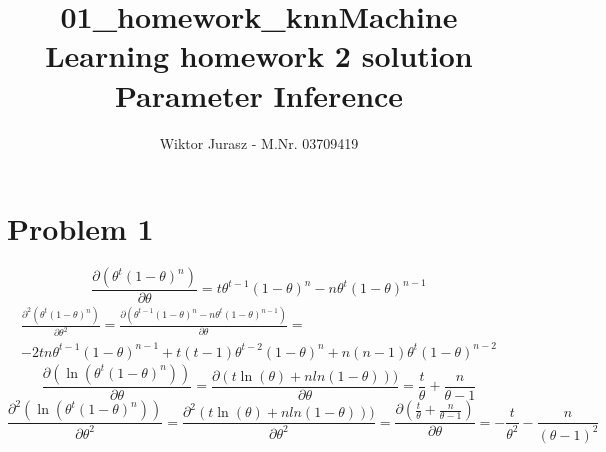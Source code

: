 \documentclass{article}
\title{01\_homework\_knn}
\begin{document}
\title{Machine Learning homework 2 solution \\
        \large Parameter Inference}

\author{Wiktor Jurasz - M.Nr. 03709419}
\maketitle

\section{Problem 1}
\begin{equation}
\frac{\partial(\theta^t(1-\theta)^n)}{\partial\theta} = t\theta^{t-1}(1-\theta)^n - n\theta^t(1-\theta)^{n-1}
\end{equation}
\begin{multline}
\frac{\partial^2(\theta^t(1-\theta)^n)}{\partial\theta^2} = 
\frac{\partial(\theta^{t-1}(1-\theta)^n - n\theta^t(1-\theta)^{n-1})}{\partial\theta}=\\
-2tn\theta^{t-1}(1-\theta)^{n-1} + t(t-1)\theta^{t-2}(1-\theta)^n + n(n-1)\theta^t(1-\theta)^{n-2}
\end{multline}
\begin{equation}
\frac{\partial(\ln(\theta^t(1-\theta)^n))}{\partial\theta} = 
\frac{\partial(t\ln(\theta) + nln(1-\theta)))}{\partial\theta} = \frac{t}{\theta} + \frac{n}{\theta-1}
\end{equation}
\begin{equation}
\frac{\partial^2(\ln(\theta^t(1-\theta)^n))}{\partial\theta^2} = 
\frac{\partial^2(t\ln(\theta) + nln(1-\theta)))}{\partial\theta^2} = 
\frac{\partial(\frac{t}{\theta} + \frac{n}{\theta-1})}{\partial\theta} =
-\frac{t}{\theta^2} - \frac{n}{(\theta-1)^2}
\end{equation}
\end{document}
